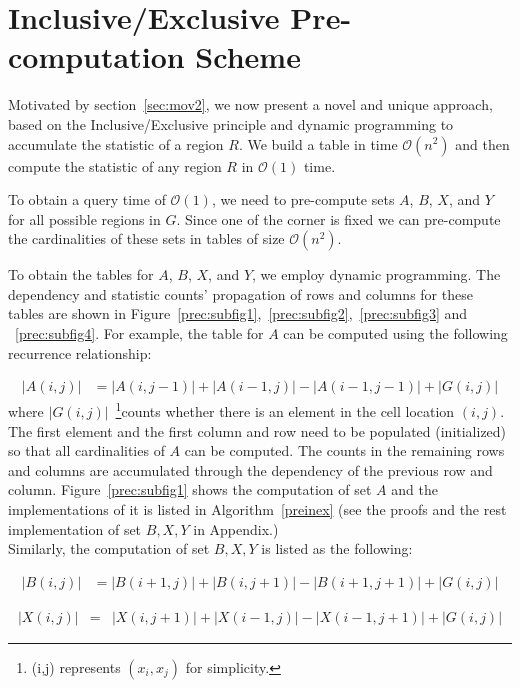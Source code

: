 \documentclass[AMA,LATO1COL]{WileyNJD-v2}
\newcommand\bigo{\mathcal O}
\begin{document}
\section {Inclusive/Exclusive Pre-computation Scheme} \label{DM}

Motivated by section~\ref{sec:mov2}, we now present a novel and unique approach, based on the Inclusive/Exclusive principle and
dynamic programming to accumulate the statistic of a region $R$. We build a table in time $\bigo(n^2)$ and then compute the statistic of any region $R$ in $\bigo(1)$ time.

To obtain a query time of $\bigo(1)$, we need to pre-compute sets $A$, $B$, $X$, and $Y$ for all possible regions in $G$. Since one of the corner is fixed we can pre-compute the cardinalities of these sets in tables of size $\bigo(n^2)$.

To obtain the tables for $A$, $B$, $X$, and $Y$, we employ dynamic programming. The dependency and statistic counts' propagation of rows and columns for these tables are shown in Figure~\ref{prec:subfig1},~\ref{prec:subfig2},~\ref{prec:subfig3} and ~\ref{prec:subfig4}. For example, the table for $A$ can be computed using the following recurrence relationship:


\begin{eqnarray}
|A(i,j)|  &= |A(i,j-1)| + |A(i-1,j)| - |A(i-1,j-1)|  + |G(i,j)|
\end{eqnarray}
\normalsize
where $|G(i,j)|$~\footnote{(i,j) represents $(x_i,x_j)$ for simplicity.}counts whether there is an element in the cell location $(i,j)$. The first element and the first column and row need to be populated (initialized) so that all cardinalities of $A$ can be computed. The counts in the remaining rows and columns are accumulated through the dependency of the previous row and column. Figure~\ref{prec:subfig1} shows the computation of set $A$ and the implementations of it is listed in Algorithm~\ref{preinex} (see the proofs and the rest implementation of set $B,X,Y$ in Appendix.)\\

Similarly, the computation of set $B,X,Y$ is listed as the following:

\begin{eqnarray}
|B(i,j)|  &= |B(i+1,j)| + |B(i,j+1)| - |B(i+1,j+1)| + |G(i,j)|
\end{eqnarray}
\normalsize

\begin{eqnarray}
|X(i,j)|  &= & |X(i,j+1)| + |X(i-1,j)| - |X(i-1,j+1)| + |G(i,j)|
\end{eqnarray}
\normalsize
\end{document}
